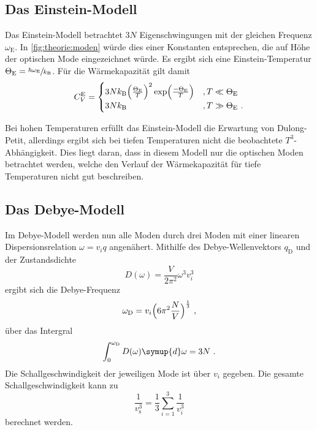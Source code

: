 \subsection{Das Einstein-Modell}
\label{sec:theorie:einstein}

    Das Einstein-Modell betrachtet $3N$ Eigenschwingungen mit der gleichen Frequenz $\omega_\text{E}$.
    In \autoref{fig:theorie:moden} würde dies einer Konstanten entsprechen,
    die auf Höhe der optischen Mode eingezeichnet würde.
    Es ergibt sich eine Einstein-Temperatur $\Theta_\text{E} = \sfrac{\hbar \omega_\text{E}}{k_\text{B}}$.
    Für die Wärmekapazität gilt damit
    \begin{equation*}
        C^{\text{E}}_V =
        \begin{cases}
            3Nk_\text{B} \Bigl(\frac{\Theta_\text{E}}{T}\Bigr)^2 \exp\Bigl(\frac{-\Theta_\text{E}}{T}\Bigr) & , T \ll \Theta_\text{E} \\
            3Nk_\text{B} & , T \gg \Theta_\text{E} \ .
        \end{cases}
    \end{equation*}

    Bei hohen Temperaturen erfüllt das Einstein-Modell die Erwartung von Dulong-Petit,
    allerdings ergibt sich bei tiefen Temperaturen nicht die beobachtete $T^3$-Abhängigkeit.
    Dies liegt daran,
    dass in diesem Modell nur die optischen Moden betrachtet werden,
    welche den Verlauf der Wärmekapazität für tiefe Temperaturen nicht gut beschreiben.

\subsection{Das Debye-Modell}
\label{sec:theorie:debye}

    Im Debye-Modell werden nun alle Moden durch drei Moden mit einer linearen Dispersionsrelation $\omega = v_i q$ angenähert.
    Mithilfe des Debye-Wellenvektors $q_\text{D}$ und der Zustandsdichte
    \begin{equation*}
        D(\omega) = \frac{V}{2 \pi^2}{\omega^3}{v^3_i}
    \end{equation*}
    ergibt sich die Debye-Frequenz
    \begin{equation*}
        \omega_\text{D} = v_i \Bigl(6 \pi^2 \frac{N}{V}\Bigr)^{\frac{1}{3}} \ ,
    \end{equation*}
    über das Intergral
    \begin{equation*}
        \int_0^{\omega_\text{D}} D(\omega) \symup{d}\omega = 3N \ .
    \end{equation*}
    Die Schallgeschwindigkeit der jeweiligen Mode ist über $v_i$ gegeben.
    Die gesamte Schallgeschwindigkeit kann zu
    \begin{equation}
        \frac{1}{v^3_\text{s}} = \frac{1}{3} \sum_{i=1}^3 \frac{1}{v^3_i}
        \label{eqn:theorie:schallgeschwindigkeit}
    \end{equation}
    berechnet werden.

